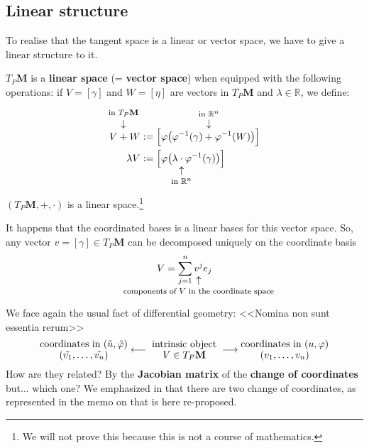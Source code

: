 \documentclass[../main.tex]{subfiles}
\begin{document}
\subsection{Linear structure}
To realise that the tangent space is a linear or vector space, we have to give a linear structure to it.
\begin{definition}
$T_P\mathbf{M}$ is a \textbf{linear space} (= \textbf{vector space}) when equipped with the following operations: if $V=[\gamma]$ and $W=[\eta]$ are vectors in $T_P\mathbf{M}$ and $\lambda\in\mathbb{R}$, we define:
\[
\begin{split}
V\overset{\mathclap{\tikz \node {$\downarrow$} node [above=1ex] {\footnotesize in $T_P\mathbf{M}$};}}{+}W&:=\Big[\varphi\big(\varphi^{-1}(\gamma)\overset{\mathclap{\tikz \node {$\downarrow$} node [above=1ex] {\footnotesize in $\mathbb{R}^n$};}}{+}\varphi^{-1}(W)\big)\Big]\\
\lambda V&:=\Big[\varphi\big(\lambda \underset{\mathclap{\tikz \node {$\uparrow$} node [below=1ex] {\footnotesize in $\mathbb{R}^n$};}}{\cdot} \varphi^{-1}(\gamma)\big)\Big]
\end{split}
\]
$(T_P\mathbf{M},+,\cdot)$ is a linear space.\footnote{We will not prove this because this is not a course of mathematics.}
\end{definition}
It happens that the coordinated bases is a linear bases for this vector space. So, any vector $v=[\gamma]\in T_P\mathbf{M}$ can be decomposed uniquely on the coordinate basis
\[
V=\sum_{j=1}^n \underset{\mathclap{\tikz \node {$\uparrow$} node [below=1ex] {\footnotesize components of $V$ in the coordinate space};}}{v^j} e_j
\]
We face again the usual fact of differential geometry: <<Nomina non sunt essentia rerum>>
\[
\text{\parbox{3.125 cm}{\centering coordinates in $(\tilde{u},\tilde{\varphi})$\\[-1pt]  $(\tilde{v_1},\dots,\tilde{v_n})$}} \longleftarrow {\parbox{2.5 cm}{\centering intrinsic object\\[-1pt]  $V \in T_P\mathbf{M}$}} \longrightarrow {\text{\parbox{3.125 cm}{\centering coordinates in $(u,\varphi)$ \\[-1pt] $(v_1,\dots,v_n$)}}}
\]
How are they related? By the \textbf{Jacobian matrix} of the \textbf{change of coordinates} but... which one? We emphasized in  that there are two change of coordinates, as represented in the memo on  that is here re-proposed. 
\end{document}
